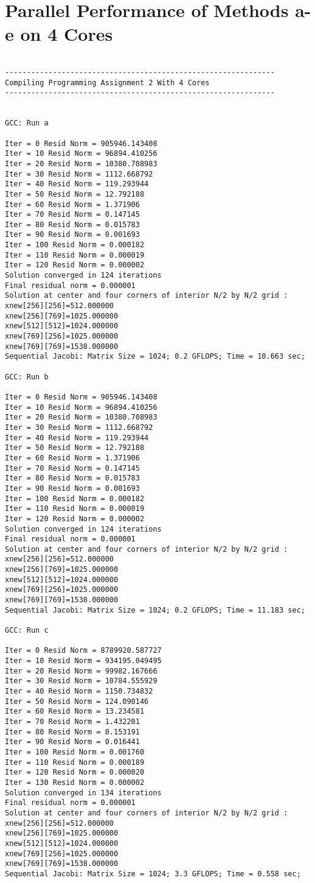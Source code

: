 \documentclass[11pt]{article}
\begin{document}
\section{Parallel Performance of Methods a-e on 4 Cores}
\begin{lstlisting}
 
--------------------------------------------------------------
Compiling Programming Assignment 2 With 4 Cores
--------------------------------------------------------------
 
 
GCC: Run a
 
Iter = 0 Resid Norm = 905946.143408
Iter = 10 Resid Norm = 96894.410256
Iter = 20 Resid Norm = 10380.708983
Iter = 30 Resid Norm = 1112.668792
Iter = 40 Resid Norm = 119.293944
Iter = 50 Resid Norm = 12.792188
Iter = 60 Resid Norm = 1.371906
Iter = 70 Resid Norm = 0.147145
Iter = 80 Resid Norm = 0.015783
Iter = 90 Resid Norm = 0.001693
Iter = 100 Resid Norm = 0.000182
Iter = 110 Resid Norm = 0.000019
Iter = 120 Resid Norm = 0.000002
Solution converged in 124 iterations
Final residual norm = 0.000001
Solution at center and four corners of interior N/2 by N/2 grid : 
xnew[256][256]=512.000000
xnew[256][769]=1025.000000
xnew[512][512]=1024.000000
xnew[769][256]=1025.000000
xnew[769][769]=1538.000000
Sequential Jacobi: Matrix Size = 1024; 0.2 GFLOPS; Time = 10.663 sec; 
 
GCC: Run b
 
Iter = 0 Resid Norm = 905946.143408
Iter = 10 Resid Norm = 96894.410256
Iter = 20 Resid Norm = 10380.708983
Iter = 30 Resid Norm = 1112.668792
Iter = 40 Resid Norm = 119.293944
Iter = 50 Resid Norm = 12.792188
Iter = 60 Resid Norm = 1.371906
Iter = 70 Resid Norm = 0.147145
Iter = 80 Resid Norm = 0.015783
Iter = 90 Resid Norm = 0.001693
Iter = 100 Resid Norm = 0.000182
Iter = 110 Resid Norm = 0.000019
Iter = 120 Resid Norm = 0.000002
Solution converged in 124 iterations
Final residual norm = 0.000001
Solution at center and four corners of interior N/2 by N/2 grid : 
xnew[256][256]=512.000000
xnew[256][769]=1025.000000
xnew[512][512]=1024.000000
xnew[769][256]=1025.000000
xnew[769][769]=1538.000000
Sequential Jacobi: Matrix Size = 1024; 0.2 GFLOPS; Time = 11.183 sec; 
 
GCC: Run c
 
Iter = 0 Resid Norm = 8789920.587727
Iter = 10 Resid Norm = 934195.049495
Iter = 20 Resid Norm = 99982.167666
Iter = 30 Resid Norm = 10784.555929
Iter = 40 Resid Norm = 1150.734832
Iter = 50 Resid Norm = 124.090146
Iter = 60 Resid Norm = 13.234581
Iter = 70 Resid Norm = 1.432201
Iter = 80 Resid Norm = 0.153191
Iter = 90 Resid Norm = 0.016441
Iter = 100 Resid Norm = 0.001760
Iter = 110 Resid Norm = 0.000189
Iter = 120 Resid Norm = 0.000020
Iter = 130 Resid Norm = 0.000002
Solution converged in 134 iterations
Final residual norm = 0.000001
Solution at center and four corners of interior N/2 by N/2 grid : 
xnew[256][256]=512.000000
xnew[256][769]=1025.000000
xnew[512][512]=1024.000000
xnew[769][256]=1025.000000
xnew[769][769]=1538.000000
Sequential Jacobi: Matrix Size = 1024; 3.3 GFLOPS; Time = 0.558 sec; 
 

\end{lstlisting}
\end{document}
